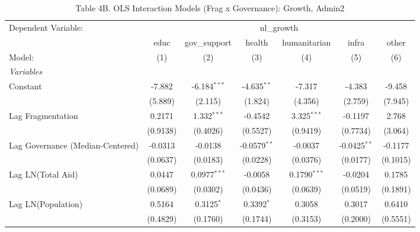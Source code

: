 \begin{table}[H]
   \caption{Table 4B. OLS Interaction Models (Frag x Governance): Growth, Admin2}
   \centering
   \begin{tabular}{lcccccc}
      \tabularnewline \midrule \midrule
      Dependent Variable: & \multicolumn{6}{c}{nl\_growth}\\
                                                           & educ     & gov\_support   & health         & humanitarian   & infra          & other \\   
      Model:                                               & (1)      & (2)            & (3)            & (4)            & (5)            & (6)\\  
      \midrule
      \emph{Variables}\\
      Constant                                             & -7.882   & -6.184$^{***}$ & -4.635$^{**}$  & -7.317         & -4.383         & -9.458\\   
                                                           & (5.889)  & (2.115)        & (1.824)        & (4.356)        & (2.759)        & (7.945)\\   
      Lag Fragmentation                                    & 0.2171   & 1.332$^{***}$  & -0.4542        & 3.325$^{***}$  & -0.1197        & 2.768\\   
                                                           & (0.9138) & (0.4026)       & (0.5527)       & (0.9419)       & (0.7734)       & (3.064)\\   
      Lag Governance (Median-Centered)                     & -0.0313  & -0.0138        & -0.0579$^{**}$ & -0.0037        & -0.0425$^{**}$ & -0.1177\\   
                                                           & (0.0637) & (0.0183)       & (0.0228)       & (0.0376)       & (0.0177)       & (0.1015)\\   
      Lag LN(Total Aid)                                    & 0.0447   & 0.0977$^{***}$ & -0.0058        & 0.1790$^{***}$ & -0.0204        & 0.1785\\   
                                                           & (0.0689) & (0.0302)       & (0.0436)       & (0.0639)       & (0.0519)       & (0.1891)\\   
      Lag LN(Population)                                   & 0.5164   & 0.3125$^{*}$   & 0.3392$^{*}$   & 0.3058         & 0.3017         & 0.6410\\   
                                                           & (0.4829) & (0.1760)       & (0.1744)       & (0.3153)       & (0.2000)       & (0.5551)\\   

\end{tabular}
\end{table}
